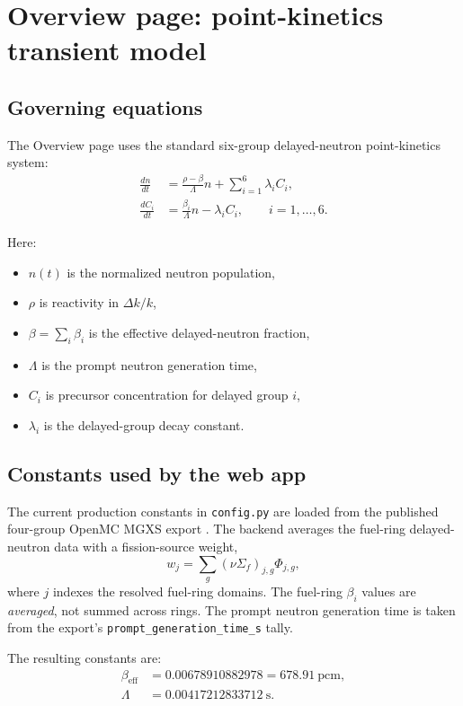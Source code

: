 \documentclass[11pt]{article}
\begin{document}
\section{Overview page: point-kinetics transient model}

\subsection{Governing equations}

The Overview page uses the standard six-group delayed-neutron point-kinetics
system:
\begin{align}
\frac{dn}{dt} &= \frac{\rho - \beta}{\Lambda} n + \sum_{i=1}^{6}\lambda_i C_i,
\\
\frac{dC_i}{dt} &= \frac{\beta_i}{\Lambda} n - \lambda_i C_i,
\qquad i=1,\dots,6.
\end{align}

Here:
\begin{itemize}
  \item $n(t)$ is the normalized neutron population,
  \item $\rho$ is reactivity in $\Delta k/k$,
  \item $\beta = \sum_i \beta_i$ is the effective delayed-neutron fraction,
  \item $\Lambda$ is the prompt neutron generation time,
  \item $C_i$ is precursor concentration for delayed group $i$,
  \item $\lambda_i$ is the delayed-group decay constant.
\end{itemize}

\subsection{Constants used by the web app}

The current production constants in \texttt{config.py} are loaded from the
published four-group OpenMC MGXS export
.
The backend averages the fuel-ring delayed-neutron data with a fission-source
weight,
\[
w_j = \sum_g \left(\nu\Sigma_f\right)_{j,g}\Phi_{j,g},
\]
where $j$ indexes the resolved fuel-ring domains.  The fuel-ring $\beta_i$
values are \emph{averaged}, not summed across rings.  The prompt neutron
generation time is taken from the export's \texttt{prompt\_generation\_time\_s}
tally.

The resulting constants are:
\begin{align*}
\beta_{\mathrm{eff}} &= 0.00678910882978 = 678.91\ \mathrm{pcm}, \\
\Lambda &= 0.00417212833712\ \mathrm{s}.
\end{align*}
\end{document}
